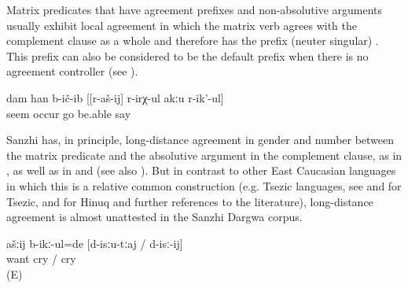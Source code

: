 Matrix predicates that have agreement prefixes and non-absolutive arguments usually exhibit local agreement in which the matrix verb agrees with the complement clause as a whole and therefore has the prefix  (neuter singular) . This prefix can also be considered to be the default prefix when there is no agreement controller (see ).
%
\begin{exe}
	\ex	\label{ex:‎I thought that she cannot walk}
	\gll	dam	han	b-ič-ib	[[r-aš-ij]	r-irχ-ul	akːu	r-ik'-ul]\\
			seem	occur	\tsc{f-}go be.able		say\\
	\glt	{}
\end{exe}

Sanzhi has, in principle, long-distance agreement in gender and number between the matrix predicate and the absolutive argument in the complement clause, as in , as well as in  and  (see also ). But in contrast to other East Caucasian languages in which this is a relative common construction (e.g. Tsezic languages, see \citealp{Polinsky.Potsdam2001} and \citealp{Polinsky2003} for Tsezic, and \citealp[628]{Forker2013a} for Hinuq and further references to the literature), long-distance agreement is almost unattested in the Sanzhi Dargwa corpus. 
%
\begin{exe}
	\ex	\label{ex:You wanted to cry1}
	\gll	ašːij	b-ikː-ul=de	[d-isːu-tːaj	/	d-isː-ij]\\
			want	cry	/	cry\\
	\glt	{} (E)
\end{exe}

